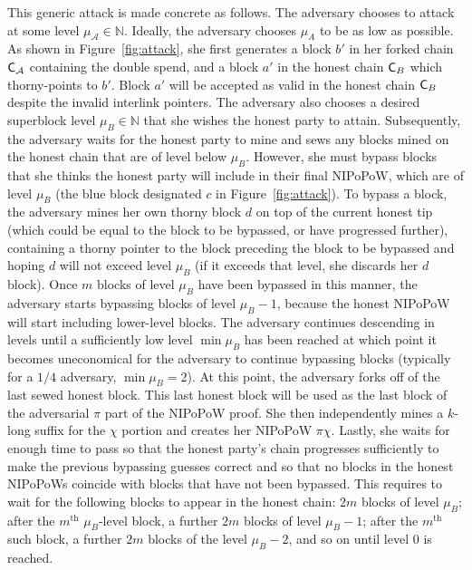 This generic attack is made concrete as follows.
The adversary chooses to attack at some level $\mu_\mathcal{A} \in \mathbb{N}$. Ideally, the adversary chooses $\mu_A$ to be as low as possible. As shown in Figure~\ref{fig:attack}, she first generates a block $b'$ in her forked chain $\mathsf{C}_\mathcal{A}$ containing the double spend, and a block $a'$ in the honest chain $\mathsf{C}_B$ which thorny-points to $b'$. Block $a'$ will be accepted as valid in the honest chain $\mathsf{C}_B$ despite the invalid interlink pointers. The adversary also chooses a desired superblock level $\mu_B \in \mathbb{N}$ that she wishes the honest party to attain. Subsequently, the adversary waits for the honest party to mine and sews any blocks mined on the honest chain that are of level below $\mu_B$. However, she must bypass blocks that she thinks the honest party will include in their final NIPoPoW, which are of level $\mu_B$ (the blue block designated $c$ in Figure~\ref{fig:attack}). To bypass a block, the adversary mines her own thorny block $d$ on top of the current honest tip (which could be equal to the block to be bypassed, or have progressed further), containing a thorny pointer to the block preceding the block to be bypassed and hoping $d$ will not exceed level $\mu_B$ (if it exceeds that level, she discards her $d$ block). Once $m$ blocks of level $\mu_B$ have been bypassed in this manner, the adversary starts bypassing blocks of level $\mu_B - 1$, because the honest NIPoPoW will start including lower-level blocks. The adversary continues descending in levels until a sufficiently low level $\min\mu_B$ has been reached at which point it becomes uneconomical for the adversary to continue bypassing blocks (typically for a $1/4$ adversary, $\min\mu_B = 2$). At this point, the adversary forks off of the last sewed honest block. This last honest block will be used as the last block of the adversarial $\pi$ part of the NIPoPoW proof. She then independently mines a $k$-long suffix for the $\chi$ portion and creates her NIPoPoW $\pi \chi$. Lastly, she waits for enough time to pass so that the honest party's chain progresses sufficiently to make the previous bypassing guesses correct and so that no blocks in the honest NIPoPoWs coincide with blocks that have not been bypassed. This requires to wait for the following blocks to appear in the honest chain: $2m$ blocks of level $\mu_B$; after the $m^\text{th}$ $\mu_B$-level block, a further $2m$ blocks of level $\mu_B - 1$; after the $m^\text{th}$ such block, a further $2m$ blocks of the level $\mu_B - 2$, and so on until level $0$ is reached.

